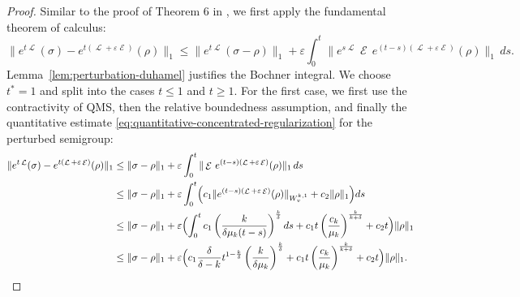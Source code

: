 \documentclass[11pt]{article}
\theoremstyle{myplain}
\theoremstyle{mydefinition}
\theoremstyle{remark}
\DeclareMathOperator{\cE}{\mathcal{E}}
\DeclareMathOperator{\cL}{\mathcal{L}}
\DeclareMathOperator{\1}{\mathds{1}}
\begin{document}
    \begin{proof}
        Similar to the proof of Theorem 6 in \cite{Szehr.2013}, we first apply the fundamental theorem of calculus:
        \begin{equation*}
            \|e^{t\cL}(\sigma)-e^{t(\cL+\varepsilon \cE)}(\rho)\|_1 \leq \|e^{t\cL}(\sigma-\rho)\|_1 + \varepsilon \int_0^t \|e^{s\cL}\cE\, e^{(t-s)(\cL+\varepsilon \cE)}(\rho)\|_1 \, ds .
        \end{equation*}
        Lemma~\ref{lem:perturbation-duhamel} justifies the Bochner integral. We choose $t^*=1$ and split into the cases $t\leq1$ and $t\geq1$. For the first case, we first use the contractivity of QMS, then the relative boundedness assumption, and finally the quantitative estimate \eqref{eq:quantitative-concentrated-regularization} for the perturbed semigroup:
        \begin{equation*}
            \begin{aligned}
                \|e^{t\cL}(\sigma)-e^{t(\cL+\varepsilon \cE)}(\rho)\|_1
                &\le \|\sigma-\rho\|_1 + \varepsilon \int_0^t \|\cE\, e^{(t-s)(\cL+\varepsilon \cE)}(\rho)\|_1 \, ds \\
                &\le \|\sigma-\rho\|_1 + \varepsilon \int_0^t \Bigl(c_1\|e^{(t-s)(\cL+\varepsilon \cE)}(\rho)\|_{W_v^{k,1}}
                + c_2\|\rho\|_1\Bigr) ds \\
                &\le \|\sigma-\rho\|_1 + \varepsilon \Bigl(\int_{0}^{t} c_1\left(\frac{k}{\delta \mu_k (t-s)}\right)^{\frac{k}{\delta}} ds + c_1 t \left(\frac{c_k}{\mu_k}\right)^{\frac{k}{k+\delta}}
                + c_2 t\Bigr) \|\rho\|_1 \\
                &\le \|\sigma-\rho\|_1 + \varepsilon \Bigl(c_1 \frac{\delta}{\delta-k} t^{1-\frac{k}{\delta}}\left(\frac{k}{\delta \mu_k}\right)^{\frac{k}{\delta}}
                + c_1 t \left(\frac{c_k}{\mu_k}\right)^{\frac{k}{k+\delta}}
                + c_2 t \Bigr)\|\rho\|_1 .
            \end{aligned}
        \end{equation*}


\end{proof}
\end{document}
